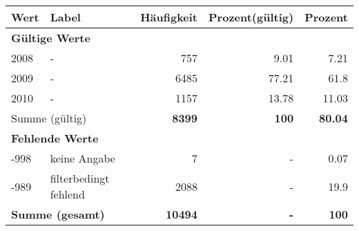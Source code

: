      \begin{longtable}{lXrrr}
     \toprule
     \textbf{Wert} & \textbf{Label} & \textbf{Häufigkeit} & \textbf{Prozent(gültig)} & \textbf{Prozent} \\
     \endhead
     \midrule
     \multicolumn{5}{l}{\textbf{Gültige Werte}}\\

     2008 &
     \multicolumn{1}{X}{ -  } &


       \num{757} &
       \num[round-mode=places,round-precision=2]{9,01} &
         \num[round-mode=places,round-precision=2]{7,21} \\

     2009 &
     \multicolumn{1}{X}{ -  } &


       \num{6485} &
       \num[round-mode=places,round-precision=2]{77,21} &
         \num[round-mode=places,round-precision=2]{61,8} \\

     2010 &
     \multicolumn{1}{X}{ -  } &


       \num{1157} &
       \num[round-mode=places,round-precision=2]{13,78} &
         \num[round-mode=places,round-precision=2]{11,03} \\
     \midrule
     \multicolumn{2}{l}{Summe (gültig)} &
       \textbf{\num{8399}} &
     \textbf{100} &
       \textbf{\num[round-mode=places,round-precision=2]{80,04}} \\
     \multicolumn{5}{l}{\textbf{Fehlende Werte}}\\
       -998 &
       keine Angabe &
         \num{7} &
        - &
         \num[round-mode=places,round-precision=2]{0,07} \\
       -989 &
       filterbedingt fehlend &
         \num{2088} &
        - &
         \num[round-mode=places,round-precision=2]{19,9} \\
     \midrule
     \multicolumn{2}{l}{\textbf{Summe (gesamt)}} &
          \textbf{\num{10494}} &
        \textbf{-} &
        \textbf{100} \\
     \bottomrule
     \end{longtable}
     
